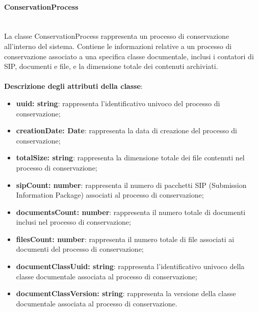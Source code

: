 \documentclass[a4paper,12pt]{article}
\begin{document}
{                \paragraph{ConservationProcess}\label{par:ConservationProcess}\mbox{}\\
                La classe ConservationProcess rappresenta un processo di conservazione all'interno del sistema. Contiene le informazioni relative a un processo di conservazione associato a una specifica classe documentale, inclusi i contatori di SIP, documenti e file, e la dimensione totale dei contenuti archiviati.\\
                \\
                \textbf{Descrizione degli attributi della classe}:
                \begin{itemize}
                    \item \textbf{uuid: string}: rappresenta l'identificativo univoco del processo di conservazione;
                    \item \textbf{creationDate: Date}: rappresenta la data di creazione del processo di conservazione;
                    \item \textbf{totalSize: string}: rappresenta la dimensione totale dei file contenuti nel processo di conservazione;
                    \item \textbf{sipCount: number}: rappresenta il numero di pacchetti SIP (Submission Information Package) associati al processo di conservazione;
                    \item \textbf{documentsCount: number}: rappresenta il numero totale di documenti inclusi nel processo di conservazione;
                    \item \textbf{filesCount: number}: rappresenta il numero totale di file associati ai documenti del processo di conservazione;
                    \item \textbf{documentClassUuid: string}: rappresenta l'identificativo univoco della classe documentale associata al processo di conservazione;
                    \item \textbf{documentClassVersion: string}: rappresenta la versione della classe documentale associata al processo di conservazione.
                \end{itemize}
 
}
\end{document}
